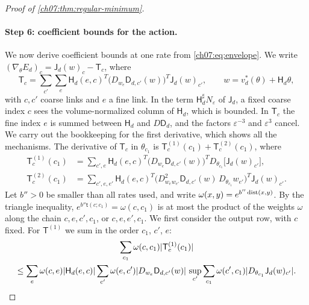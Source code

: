 \begin{proof}[Proof of \cref{ch07:thm:regular-minimum}]
\paragraph{Step 6: coefficient bounds for the action.}
We now derive coefficient bounds at one rate from \eqref{ch07:eq:envelope}. We write $(\nabla_\theta E_d)_c=\mathsf J_d(w)_c-\mathsf T_c$, where
\[
 \mathsf T_c=\sum_{c'}\sum_e\mathsf H_d(e,c)^T\bigl(D_{w_e}\mathsf D_{d,c'}(w)\bigr)^T\mathsf J_d(w)_{c'},\qquad w=v_d^*(\theta)+\mathsf H_d\theta,
\]
with $c,c'$ coarse links and $e$ a fine link. In the term $\mathsf H_d^\sharp N_\varepsilon$ of $\mathsf J_d$, a fixed coarse index $c$ sees the volume-normalized column of $\mathsf H_d$, which is bounded. In $\mathsf T_c$ the fine index $e$ is summed between $\mathsf H_d$ and $D\mathsf D_d$, and the factors $\varepsilon^{-3}$ and $\varepsilon^3$ cancel. We carry out the bookkeeping for the first derivative, which shows all the mechanisms. The derivative of $\mathsf T_c$ in $\theta_{c_1}$ is $\mathsf T^{(1)}_c(c_1)+\mathsf T^{(2)}_c(c_1)$, where
\[
 \begin{aligned}
 \mathsf T^{(1)}_c(c_1)&=\sum_{c',e}\mathsf H_d(e,c)^T\bigl(D_{w_e}\mathsf D_{d,c'}(w)\bigr)^TD_{\theta_{c_1}}\bigl[\mathsf J_d(w)_{c'}\bigr],\\
 \mathsf T^{(2)}_c(c_1)&=\sum_{c',e,e'}\mathsf H_d(e,c)^T\bigl(D^2_{w_ew_{e'}}\mathsf D_{d,c'}(w)\,D_{\theta_{c_1}}w_{e'}\bigr)^T\mathsf J_d(w)_{c'} .
 \end{aligned}
\]
Let $b''>0$ be smaller than all rates used, and write $\omega(x,y)=e^{b''\operatorname{dist}(x,y)}$. By the triangle inequality, $e^{b''\mathsf t(c;c_1)}=\omega(c,c_1)$ is at most the product of the weights $\omega$ along the chain $c,e,c',c_1$, or $c,e,e',c_1$. We first consider the output row, with $c$ fixed. For $\mathsf T^{(1)}$ we sum in the order $c_1$, $c'$, $e$:
\begin{multline*}
 \sum_{c_1}\omega(c,c_1)\lvert \mathsf T^{(1)}_c(c_1)\rvert\\
 \le\sum_e\omega(c,e)\lvert \mathsf H_d(e,c)\rvert\sum_{c'}\omega(e,c')\lvert D_{w_e}\mathsf D_{d,c'}(w)\rvert\,\sup_{c'}\sum_{c_1}\omega(c',c_1)\lvert D_{\theta_{c_1}}\mathsf J_d(w)_{c'}\rvert .
\end{multline*}

\end{proof}
